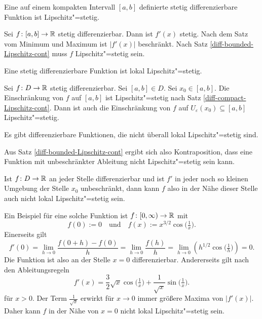 \begin{Satz}\label{diff-compact-Lipschitz-cont}
Eine auf einem kompakten Intervall $[a,b]$ definierte stetig
differenzierbare Funktion ist Lipschitz"=stetig.
\end{Satz}
\begin{Beweis}
Sei $f\colon [a,b]\to\mathbb R$ stetig differenzierbar. Dann ist $f'(x)$ stetig.
Nach dem Satz vom Minimum und Maximum ist $|f'(x)|$ beschränkt. Nach
Satz \ref{diff-bounded-Lipschitz-cont} muss $f$ Lipschitz"=stetig
sein.\;\qedsymbol
\end{Beweis}

\begin{Korollar}
Eine stetig differenzierbare Funktion ist lokal Lipschitz"=stetig.
\end{Korollar}
\begin{Beweis}
Sei $f\colon D\to\mathbb R$ stetig differenzierbar. Sei $[a,b]\in D$. Sei
$x_0\in [a,b]$. Die Einschränkung von $f$ auf $[a,b]$ ist
Lipschitz"=stetig nach Satz \ref{diff-compact-Lipschitz-cont}.
Dann ist auch die Einschränkung von $f$ auf
$U_\varepsilon(x_0)\subseteq [a,b]$ Lipschitz"=stetig.\;\qedsymbol
\end{Beweis}

\begin{Satz}
Es gibt differenzierbare Funktionen, die nicht überall lokal
Lipschitz"=stetig sind.
\end{Satz}
\begin{Beweis}
Aus Satz \ref{diff-bounded-Lipschitz-cont} ergibt sich also
Kontraposition, dass eine Funktion mit unbeschränkter Ableitung
nicht Lipschitz"=stetig sein kann.

Ist $f\colon D\to\mathbb R$ an jeder Stelle differenzierbar und ist $f'$
in jeder noch so kleinen Umgebung der Stelle $x_0$ unbeschränkt, dann
kann $f$ also in der Nähe dieser Stelle auch nicht lokal
Lipschitz"=stetig sein.

Ein Beispiel für eine solche Funktion ist $f\colon{}[0,\infty)\to\mathbb R$
mit
\[f(0):=0\quad \text{und}\quad f(x):=x^{3/2}\cos\Big(\tfrac{1}{x}\Big).\]
Einerseits gilt
\[f'(0) = \lim_{h\to 0}\frac{f(0+h)-f(0)}{h} = \lim_{h\to 0}\frac{f(h)}{h}
= \lim_{h\to 0} (h^{1/2}\cos\Big(\tfrac{1}{h}\Big)) = 0.\]
Die Funktion ist also an der Stelle $x=0$ differenzierbar.
Andererseits gilt nach den Ableitungsregeln
\[f'(x) = \frac{3}{2}\sqrt{x}\cos\Big(\tfrac{1}{x}\Big)+\frac{1}{\sqrt{x}}\sin\Big(\tfrac{1}{x}\Big).\]
für $x>0$. Der Term $\tfrac{1}{\sqrt{x}}$ erwirkt für $x\to 0$ immer
größere Maxima von $|f'(x)|$. Daher kann $f$ in der Nähe von $x=0$ nicht
lokal Lipschitz"=stetig sein.\;\qedsymbol
\end{Beweis}

